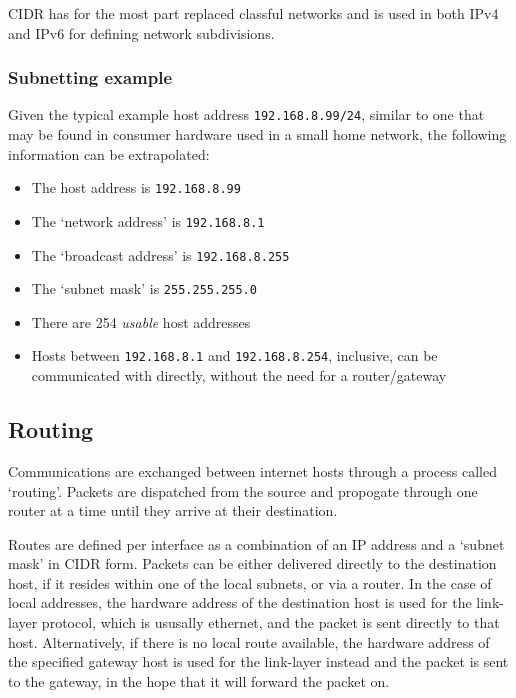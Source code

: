     CIDR has for the most part replaced classful networks and is used in both IPv4 and IPv6 for defining network subdivisions.

        \subsubsection{Subnetting example}
        Given the typical example host address \texttt{192.168.8.99/24}, similar to one that may be found in consumer hardware used in a small home network, the following information can be extrapolated:
        \begin{itemize}[noitemsep]
            \item{The host address is \texttt{192.168.8.99}}
            \item{The `network address' is \texttt{192.168.8.1}}
            \item{The `broadcast address' is \texttt{192.168.8.255}}
            \item{The `subnet mask' is \texttt{255.255.255.0}}
            \item{There are 254 \textit{usable} host addresses}
            \item{Hosts between \texttt{192.168.8.1} and \texttt{192.168.8.254}, inclusive, can be communicated with directly, without the need for a router/gateway}
        \end{itemize}

    \subsection{Routing}
    Communications are exchanged between internet hosts through a process called `routing'. Packets are dispatched from the source and propogate through one router at a time until they arrive at their destination.

    Routes are defined per interface as a combination of an IP address and a `subnet mask' in CIDR form. Packets can be either delivered directly to the destination host, if it resides within one of the local subnets, or via a router.
    In the case of local addresses, the hardware address of the destination host is used for the link-layer protocol, which is ususally ethernet, and the packet is sent directly to that host.
    Alternatively, if there is no local route available, the hardware address of the specified gateway host is used for the link-layer instead and the packet is sent to the gateway, in the hope that it will forward the packet on.


